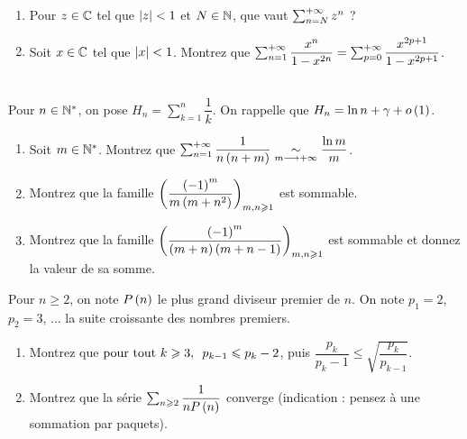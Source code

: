 \begin{exoss}[Exercice 26]
\begin{enumerate}
    \item Pour \(z\in\mathbb{C}\) tel que \(\left\lvert z\right\rvert<1\) et \(N\in\mathbb{N}\), que vaut \(\sum_{n=N}^{+\infty}z^n\) ? \\
    \item Soit \(x\in\mathbb{C}\) tel que \(\left\lvert x\right\rvert<1\). Montrez que \(\sum_{n=1}^{+\infty}\dfrac{x^n}{1-x^{2n}}=\sum_{p=0}^{+\infty}\dfrac{x^{2p+1}}{1-x^{2p+1}}\).
\end{enumerate}
\end{exoss}

\begin{corr}
\end{corr}

\begin{exoss}[Exercice 27]~\\
Pour \(n\in\mathbb{N}^*\), on pose \(H_n=\sum_{k=1}^{n}\dfrac{1}{k}\). On rappelle que \(H_n=\ln n+\gamma+o\left(1\right)\).

\begin{enumerate}
    \item Soit \(m\in\mathbb{N}^*\). Montrez que \(\sum_{n=1}^{+\infty}\dfrac{1}{n\left(n+m\right)}\underset{m\longrightarrow+\infty}{\sim}\dfrac{\ln m}{m}\). \\
    \item Montrez que la famille \(\left(\dfrac{\left(-1\right)^m}{m\left(m+n^2\right)}\right)_{m,n\geqslant1}\) est sommable. \\
    \item Montrez que la famille \(\left(\dfrac{\left(-1\right)^m}{\left(m+n\right)\left(m+n-1\right)}\right)_{m,n\geqslant1}\) est sommable et donnez la valeur de sa somme.
\end{enumerate}
\end{exoss}

\begin{corr}
\end{corr}

\begin{exoss}[Exercice 28]
Pour \(n\geq2\), on note \(P\left(n\right)\) le plus grand diviseur premier de \(n\). On note \(p_1=2\), \(p_2=3\), \(\dots\) la suite croissante des nombres premiers.

\begin{enumerate}
    \item Montrez que \(\quantifs{\tpt k\geq3}p_{k-1}\leq p_k-2\), puis \(\dfrac{p_k}{p_k-1}\leq\sqrt{\dfrac{p_k}{p_{k-1}}}\). \\
    \item Montrez que la série \(\sum_{n\geqslant2}\dfrac{1}{nP\left(n\right)}\) converge (indication : pensez à une sommation par paquets).
\end{enumerate}
\end{exoss}

